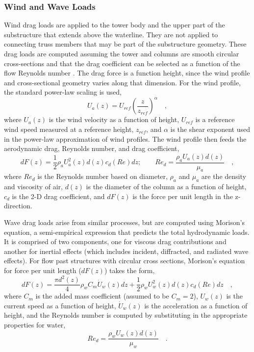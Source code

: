 \subsubsection{Wind and Wave Loads}
Wind drag loads are applied to the tower body and the upper part of the
substructure that extends above the waterline.  They are not applied to
connecting truss members that may be part of the substructure geometry.
These drag loads are computed assuming the tower and columns are smooth
circular cross-sections and that the drag coefficient can be selected as
a function of the flow Reynolds number \citep{Roshko}.  The drag force
is a function height, since the wind profile and cross-sectional geometry varies
along that dimension.  For the wind profile, the standard power-law
scaling is used,
\begin{equation}
  U_a(z) = U_{ref}\left(\frac{z}{z_{ref}}\right)^{\alpha}\quad,
\end{equation}
where $U_a(z)$ is the wind velocity as a function of height, $U_{ref}$ is a
reference wind speed measured at a reference height, $z_{ref}$, and
$\alpha$ is the shear exponent used in the power-law approximation of
wind profiles.  The wind profile then feeds the aerodynamic drag,
Reynolds number, and drag coefficient,
\begin{equation} \label{eqn:drag}
  dF(z) = \frac{1}{2} \rho_a U_a^2(z) d(z) c_d(Re) dz;\qquad
  Re_d = \frac{\rho_a U_a(z) d(z)}{\mu_a}\quad,
\end{equation}
where $Re_d$ is the Reynolds number based on diameter, $\rho_a$ and
$\mu_a$ are the density and viscosity of air, $d(z)$ is the diameter of
the column as a function of height, $c_d$ is the 2-D drag coefficient, and
$dF(z)$ is the force per unit length in the z-direction.

Wave drag loads arise from similar processes, but are computed using
Morison's equation, a semi-empirical expression that predicts the total
hydrodynamic loads.  It is comprised of two components, one for viscous
drag contributions and another for inertial effects (which includes
incident, diffracted, and radiated wave effects).  For flow past
structures with circular cross sections, Morison's equation for force
per unit length ($dF(z)$) takes the form,
\begin{equation} \label{eqn:morison}
  dF(z) = \frac{\pi d^2(z)}{4} \rho_w C_m \dot{U}_w(z)dz + \frac{1}{2} \rho_w U_w^2(z) d(z) c_d(Re)dz\quad,
\end{equation}
where $C_m$ is the added mass coefficient (assumed to be $C_m=2$),
$U_w(z)$ is the current speed as a function of height, $\dot{U}_w(z)$ is
the acceleration as a function of height, and the Reynolds number is
computed by substituting in the appropriate properties for water,
\begin{equation}
Re_d = \frac{\rho_w U_w(z) d(z)}{\mu_w}\quad.
\end{equation}

